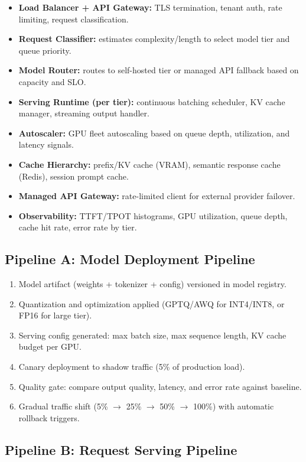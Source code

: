 \begin{itemize}
  \item \textbf{Load Balancer + API Gateway:} TLS termination, tenant auth, rate limiting, request classification.
  \item \textbf{Request Classifier:} estimates complexity/length to select model tier and queue priority.
  \item \textbf{Model Router:} routes to self-hosted tier or managed API fallback based on capacity and SLO.
  \item \textbf{Serving Runtime (per tier):} continuous batching scheduler, KV cache manager, streaming output handler.
  \item \textbf{Autoscaler:} GPU fleet autoscaling based on queue depth, utilization, and latency signals.
  \item \textbf{Cache Hierarchy:} prefix/KV cache (VRAM), semantic response cache (Redis), session prompt cache.
  \item \textbf{Managed API Gateway:} rate-limited client for external provider failover.
  \item \textbf{Observability:} TTFT/TPOT histograms, GPU utilization, queue depth, cache hit rate, error rate by tier.
\end{itemize}

\subsection*{Pipeline A: Model Deployment Pipeline}

\begin{enumerate}
  \item Model artifact (weights + tokenizer + config) versioned in model registry.
  \item Quantization and optimization applied (GPTQ/AWQ for INT4/INT8, or FP16 for large tier).
  \item Serving config generated: max batch size, max sequence length, KV cache budget per GPU.
  \item Canary deployment to shadow traffic (5\% of production load).
  \item Quality gate: compare output quality, latency, and error rate against baseline.
  \item Gradual traffic shift (5\% $\rightarrow$ 25\% $\rightarrow$ 50\% $\rightarrow$ 100\%) with automatic rollback triggers.
\end{enumerate}

\subsection*{Pipeline B: Request Serving Pipeline}

